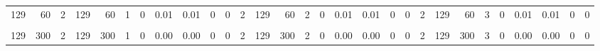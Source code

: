 \begin{table}
\begin{tabular}{rrrrrrrrrrrrrrrrrrrrrrrrrrrrr}
129 & 60 & 2 & 129 & 60 & 1 & 0 & 0.01 & 0.01 & 0 & 0 & 2 & 129 & 60 & 2 & 0 & 0.01 & 0.01 & 0 & 0 & 2 & 129 & 60 & 3 & 0 & 0.01 & 0.01 & 0 & 0\\
\addlinespace
\cellcolor{gray!6}{129} & \cellcolor{gray!6}{120} & \cellcolor{gray!6}{2} & \cellcolor{gray!6}{129} & \cellcolor{gray!6}{120} & \cellcolor{gray!6}{1} & \cellcolor{gray!6}{0} & \cellcolor{gray!6}{0.00} & \cellcolor{gray!6}{0.00} & \cellcolor{gray!6}{0} & \cellcolor{gray!6}{0} & \cellcolor{gray!6}{2} & \cellcolor{gray!6}{129} & \cellcolor{gray!6}{120} & \cellcolor{gray!6}{2} & \cellcolor{gray!6}{0} & \cellcolor{gray!6}{0.00} & \cellcolor{gray!6}{0.00} & \cellcolor{gray!6}{0} & \cellcolor{gray!6}{0} & \cellcolor{gray!6}{2} & \cellcolor{gray!6}{129} & \cellcolor{gray!6}{120} & \cellcolor{gray!6}{3} & \cellcolor{gray!6}{0} & \cellcolor{gray!6}{0.00} & \cellcolor{gray!6}{0.00} & \cellcolor{gray!6}{0} & \cellcolor{gray!6}{0}\\
129 & 300 & 2 & 129 & 300 & 1 & 0 & 0.00 & 0.00 & 0 & 0 & 2 & 129 & 300 & 2 & 0 & 0.00 & 0.00 & 0 & 0 & 2 & 129 & 300 & 3 & 0 & 0.00 & 0.00 & 0 & 0\\
\bottomrule
\end{tabular}
\end{table}
